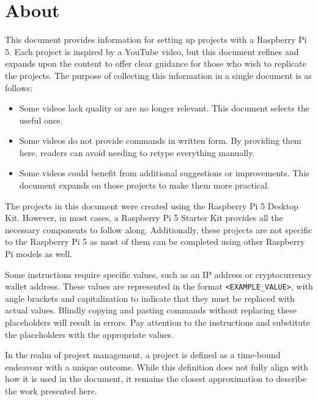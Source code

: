 \section*{ About}

This document provides information for setting up projects with a Raspberry Pi 5. Each project is inspired by a YouTube video, but this document refines and expands upon the content to offer clear guidance for those who wish to replicate the projects. The purpose of collecting this information in a single document is as follows:

\begin{itemize}
\item Some videos lack quality or are no longer relevant. This document selects the useful ones.
\item Some videos do not provide commands in written form. By providing them here, readers can avoid needing to retype everything manually.
\item Some videos could benefit from additional suggestions or improvements. This document expands on those projects to make them more practical.
\end{itemize}

The projects in this document were created using the Raspberry Pi 5 Desktop Kit. However, in most cases, a Raspberry Pi 5 Starter Kit provides all the necessary components to follow along. Additionally, these projects are not specific to the Raspberry Pi 5 as most of them can be completed using other Raspberry Pi models as well.

Some instructions require specific values, such as an IP address or cryptocurrency wallet address. These values are represented in the format \texttt{\textless EXAMPLE\_VALUE\textgreater}, with angle brackets and capitalization to indicate that they must be replaced with actual values. Blindly copying and pasting commands without replacing these placeholders will result in errors. Pay attention to the instructions and substitute the placeholders with the appropriate values.

In the realm of project management, a project is defined as a time-bound endeavour with a unique outcome. While this definition does not fully align with how it is used in the document, it remains the closest approximation to describe the work presented here.